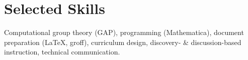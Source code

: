 \section*{Selected Skills}
	Computational group theory (GAP), programming (Mathematica), document preparation (\LaTeX{}, groff), curriculum design, discovery- \& discussion-based instruction, technical communication.




